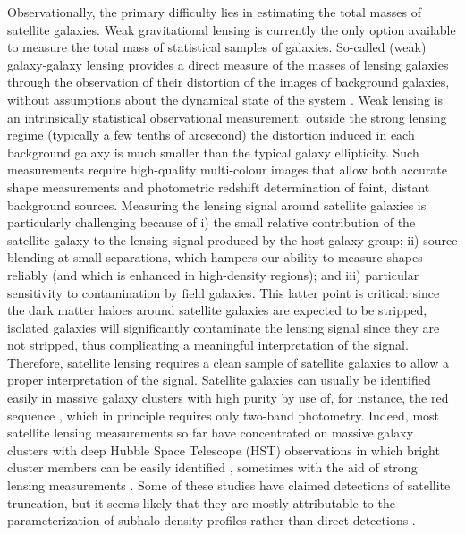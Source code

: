 Observationally, the primary difficulty lies in estimating the total masses of satellite galaxies.
Weak gravitational lensing is currently the only option available to measure the total mass of 
statistical samples of galaxies. So-called (weak) galaxy-galaxy lensing provides a direct 
measure of the masses of lensing galaxies through the observation of their distortion of the images 
of background galaxies, without assumptions about the dynamical state of the system 
\citep[e.g.,][]{brainerd96,courteau14}. Weak lensing is an intrinsically statistical observational 
measurement: outside the strong lensing regime (typically a few tenths of arcsecond) the 
distortion induced in each background galaxy is much smaller than the typical galaxy ellipticity. 
Such measurements require high-quality multi-colour images that allow both accurate shape 
measurements and photometric redshift determination of faint, distant background sources. 
Measuring the lensing signal around satellite galaxies \citep[hereafter `satellite lensing', see, 
e.g.,][]{yang06} is particularly challenging because of i) the small relative contribution of the 
satellite galaxy to the lensing signal produced by the host galaxy group; ii) source blending at 
small separations, which hampers our ability to measure shapes reliably (and which is enhanced in 
high-density regions); and iii) particular sensitivity to contamination by field 
galaxies. This latter point is critical: since the dark matter haloes around satellite galaxies are 
expected to be stripped, isolated galaxies will significantly contaminate the lensing signal since 
they are not stripped, thus complicating a meaningful interpretation of the signal. Therefore, 
satellite lensing requires a clean sample of satellite galaxies to allow a proper interpretation of 
the signal. Satellite galaxies can usually be identified easily in massive galaxy clusters with 
high purity by use of, for instance, the red sequence \citep[e.g.,][see also Chapter 4]{rozo15}, which in 
principle requires only two-band photometry. Indeed, most satellite lensing measurements so far 
have concentrated on massive galaxy clusters with deep Hubble Space Telescope (HST) observations in 
which bright cluster members can be easily identified 
\citep{natarajan02,limousin07,natarajan09}, sometimes with the aid of strong lensing 
measurements \citep{natarajan07}. Some of these studies have claimed detections of satellite 
truncation, but it seems likely that they are mostly attributable to the parameterization of 
subhalo density profiles rather than direct detections \citep{pastormira11}.

